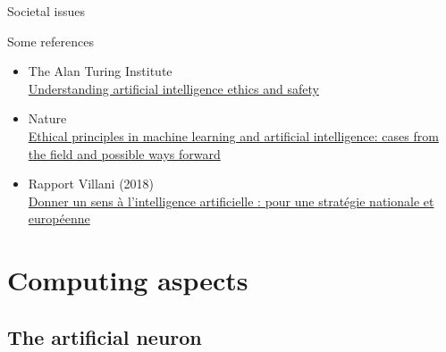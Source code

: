 \documentclass[10pt,serif,mathserif,compress,hyperref={colorlinks}]{beamer}
\begin{document}
\begin{frame}{Societal issues}

  Some references
  \begin{itemize}
  \item The Alan Turing Institute\\
    \href{http://arxiv.org/abs/1906.05684}{Understanding artificial intelligence ethics and safety}
  \item Nature\\
    \href{https://www.nature.com/articles/s41599-020-0501-9}{Ethical principles in machine learning and artificial intelligence: cases from the field and possible ways forward}
  \item Rapport Villani (2018)\\
    \href{https://www.vie-publique.fr/rapport/37225-donner-un-sens-lintelligence-artificielle-pour-une-strategie-nation}
         {Donner un sens à l'intelligence artificielle : pour une stratégie nationale et européenne}
  \end{itemize}

\end{frame}

\section{Computing aspects}

\subsection{The artificial neuron}
\end{document}
